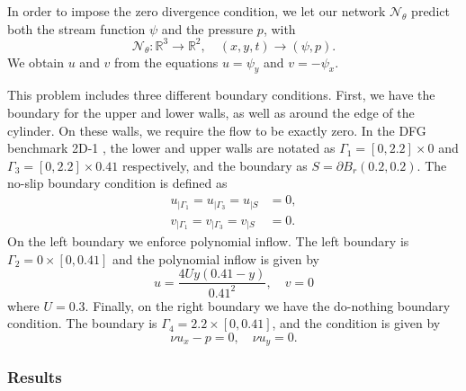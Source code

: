 In order to impose the zero divergence condition, we let our network $\mathcal{N}_\theta$ predict both the stream function $\psi$ and the pressure $p$, with
\begin{equation}
    \mathcal{N}_\theta : \mathbb{R}^3 \to \mathbb{R}^2, \quad (x,y,t)\to (\psi, p).
\end{equation}
We obtain $u$ and $v$ from the equations $u=\psi_y$ and $v=-\psi_x$.

This problem includes three different boundary conditions.
First, we have the boundary for the upper and lower walls, as well as around the edge of the cylinder.
On these walls, we require the flow to be exactly zero.
In the DFG benchmark 2D-1 \cite{DFG}, the lower and upper walls are notated as $\Gamma_1 = [0,2.2]\times 0$ and $\Gamma_3 = [0,2.2]\times 0.41$ respectively, and the boundary as $S=\partial B_r(0.2,0.2)$.
The no-slip boundary condition is defined as
\begin{align*}
    u_{|\Gamma_1} = u_{|\Gamma_3} = u_{|S} &= 0, \\
    v_{|\Gamma_1} = v_{|\Gamma_3} = v_{|S} &= 0.
\end{align*}
On the left boundary we enforce polynomial inflow.
The left boundary is $\Gamma_2 = 0\times [0,0.41]$ and the polynomial inflow is given by
\begin{equation*}
    u=\frac{4Uy(0.41-y)}{0.41^2}, \quad v=0
\end{equation*}
where $U=0.3$.
Finally, on the right boundary we have the do-nothing boundary condition.
The boundary is $\Gamma_4=2.2\times[0,0.41]$, and the condition is given by
\begin{equation*}
    \nu u_x - p = 0, \quad \nu u_y = 0.
\end{equation*}

\subsubsection{Results}
